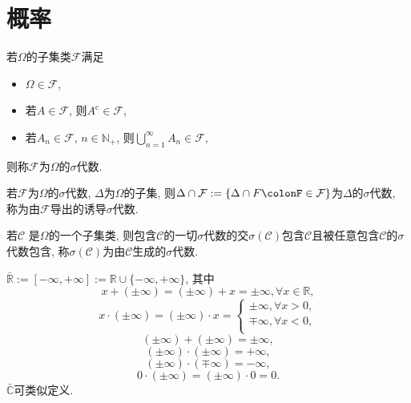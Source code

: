\chapter{概率}

\begin{definition}
    若$\Omega$的子集类$\mathcal{F}$满足\begin{itemize}
        \item $\Omega\in\mathcal{F}$,
        \item 若$A\in\mathcal{F}$, 则$A^\text{c}\in\mathcal{F}$,
        \item 若$A_n\in\mathcal{F}$, $n\in \mathbb{N}_+$, 则$\bigcup_{n=1}^{\infty}A_n\in\mathcal{F}$,
    \end{itemize}则称$\mathcal{F}$为$\Omega$的$\sigma$代数.
\end{definition}

\begin{definition}
    若$\mathcal{F}$为$\Omega$的$\sigma$代数, $\Delta$为$\Omega$的子集, 则$\Delta\cap\mathcal{F}:=\{\Delta\cap F\colonF\in\mathcal{F}\}$为$\Delta$的$\sigma$代数, 称为由$\mathcal{F}$导出的诱导$\sigma$代数.
\end{definition}

\begin{definition}
    若$\mathcal{C}$ 是$\Omega$的一个子集类, 则包含$\mathcal{C}$的一切$\sigma$代数的交$\sigma(\mathcal{C})$包含$\mathcal{C}$且被任意包含$\mathcal{C}$的$\sigma$代数包含, 称$\sigma(\mathcal{C})$为由$\mathcal{C}$生成的$\sigma$代数.
\end{definition}

\begin{definition}
    $\bar{\mathbb{R} }:=[-\infty,+\infty]:=\mathbb{R}\cup\{-\infty,+\infty\}$, 其中\begin{equation*}
        x+(\pm\infty)=(\pm\infty)+x=\pm\infty, \forall x\in\mathbb{R},
    \end{equation*}\begin{equation*}
        x\cdot(\pm\infty)=(\pm\infty)\cdot x=\begin{cases}
            \pm\infty,\forall x>0,\\
            \mp\infty,\forall x<0,\\
        \end{cases}
    \end{equation*}\begin{equation*}
        (\pm\infty)+(\pm\infty)=\pm\infty,
    \end{equation*}\begin{equation*}
        (\pm\infty)\cdot(\pm\infty)=+\infty,
    \end{equation*}\begin{equation*}
        (\pm\infty)\cdot(\mp\infty)=-\infty,
    \end{equation*}\begin{equation*}
        0\cdot(\pm\infty)=(\pm\infty)\cdot0=0.
    \end{equation*}$\bar{\mathbb{C} }$可类似定义.
\end{definition}

